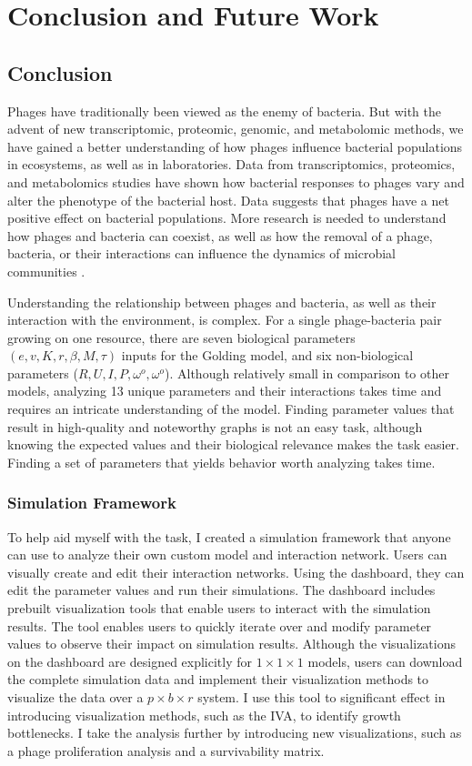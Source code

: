 \chapter{Conclusion and Future Work}
\label{CAFW}

\section{Conclusion}
\label{Conclusion}
Phages have traditionally been viewed as the enemy of bacteria. 
But with the advent of new transcriptomic, proteomic, genomic, and metabolomic methods, we have gained a better understanding of how phages influence bacterial populations in ecosystems, as well as in laboratories. 
Data from transcriptomics, proteomics, and metabolomics studies have shown how bacterial responses to phages vary and alter the phenotype of the bacterial host. 
Data suggests that phages have a net positive effect on bacterial populations. 
More research is needed to understand how phages and bacteria can coexist, as well as how the removal of a phage, bacteria, or their interactions can influence the dynamics of microbial communities \cite{fernandezPhageFoeInsight2018}. 

Understanding the relationship between phages and bacteria, as well as their interaction with the environment, is complex. 
For a single phage-bacteria pair growing on one resource, there are seven biological parameters $(e, v, K, r, \beta, M, \tau)$ inputs for the Golding model, and six non-biological parameters ($R, U, I, P, \omega^o, \omega^o$). 
Although relatively small in comparison to other models, analyzing 13 unique parameters and their interactions takes time and requires an intricate understanding of the model. 
Finding parameter values that result in high-quality and noteworthy graphs is not an easy task, although knowing the expected values and their biological relevance makes the task easier. 
Finding a set of parameters that yields behavior worth analyzing takes time. 

\subsection{Simulation Framework}
To help aid myself with the task, I created a simulation framework that anyone can use to analyze their own custom model and interaction network. 
Users can visually create and edit their interaction networks. 
Using the dashboard, they can edit the parameter values and run their simulations. 
The dashboard includes prebuilt visualization tools that enable users to interact with the simulation results. 
The tool enables users to quickly iterate over and modify parameter values to observe their impact on simulation results. 
Although the visualizations on the dashboard are designed explicitly for $1\times 1\times 1$ models, users can download the complete simulation data and implement their visualization methods to visualize the data over a $p\times b\times r$ system. 
I use this tool to significant effect in introducing visualization methods, such as the IVA, to identify growth bottlenecks. 
I take the analysis further by introducing new visualizations, such as a phage proliferation analysis and a survivability matrix. 

